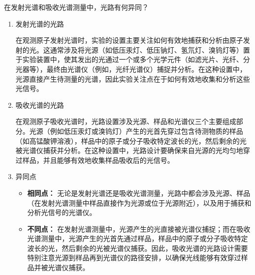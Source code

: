 \documentclass[dvipsnames, svgnames,a4paper,11pt]{article}
\begin{document}
	\begin{question}
		在发射光谱和吸收光谱测量中，光路有何异同？
	\end{question}
	\begin{enumerate}
		\item 发射光谱的光路
		
		在观测原子发射光谱时，实验的设置主要关注如何有效地捕获和分析由原子发射的光。这通常涉及将光源（如低压汞灯、低压钠灯、氢氘灯、溴钨灯等）置于实验装置中，使其发出的光通过一个或多个光学元件（如滤光片、光纤、分光器等），最终由光谱仪（例如，光纤光谱仪）捕捉并分析。在这种设置中，光源直接产生待测量的光谱，因此实验关注点在于如何有效地收集和分析这些光信号。
		
		\item 吸收光谱的光路
		
		在观测原子吸收光谱时，光路设置涉及光源、样品和光谱仪三个主要组成部分。光源（例如低压汞灯或溴钨灯）产生的光首先穿过包含待测物质的样品（如高锰酸钾溶液），样品中的原子或分子吸收特定波长的光，然后剩余的光被光谱仪捕获并分析。在这种设置中，光路设计要确保来自光源的光均匀地穿过样品，并且能够有效地收集样品吸收后的光信号。
		
		\item 异同点
		\begin{itemize}
			\item \textbf{相同点：} 无论是发射光谱还是吸收光谱测量，光路中都会涉及光源、样品（在发射光谱测量中样品直接作为光源或位于光源附近），以及用于捕获和分析光信号的光谱仪。
			\item \textbf{不同点：} 在发射光谱测量中，光源产生的光直接被光谱仪捕捉；而在吸收光谱测量中，光源产生的光首先通过样品，样品中的原子或分子吸收特定波长的光，然后剩余的光被光谱仪捕获。因此，吸收光谱的光路设计需要特别注意光源到样品再到光谱仪的路径安排，以确保光线能够有效穿过样品并被光谱仪捕获。
		\end{itemize}
	\end{enumerate}
	
\end{document}
